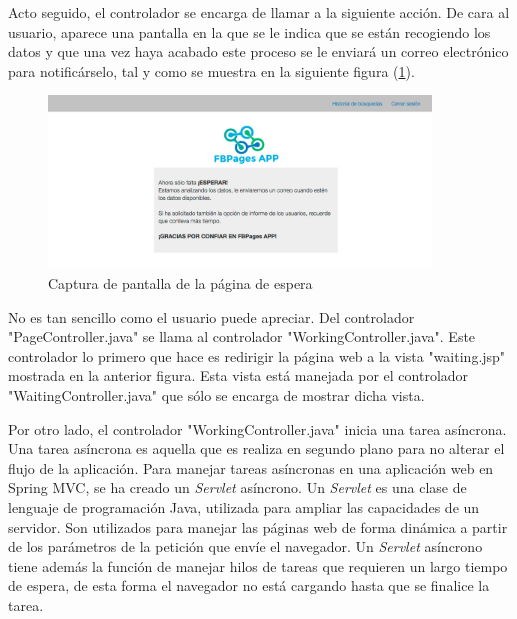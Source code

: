 Acto seguido, el controlador se encarga de llamar a la siguiente acción. De cara al usuario, aparece una pantalla en la que se le indica que se están recogiendo los datos y que una vez haya acabado este proceso se le enviará un correo electrónico para notificárselo, tal y como se muestra en la siguiente figura (\ref{fig:working}).
\begin{figure}[H]
\centering
\includegraphics[width=4in]{figuras/working.png}
\caption{Captura de pantalla de la página de espera} \label{fig:working}
\end{figure}
No es tan sencillo como el usuario puede apreciar. Del controlador "PageController.java" se llama al controlador "WorkingController.java". Este controlador lo primero que hace es redirigir la página web a la vista "waiting.jsp" mostrada en la anterior figura. Esta vista está manejada por el controlador "WaitingController.java" que sólo se encarga de mostrar dicha vista. 

Por otro lado, el controlador  "WorkingController.java" inicia una tarea asíncrona. Una tarea asíncrona es aquella que es realiza en segundo plano para no alterar el flujo de la aplicación. 
Para manejar tareas asíncronas en una aplicación web en Spring MVC, se ha creado un \textit{Servlet} asíncrono. 
Un \textit{Servlet} es una clase de lenguaje de programación Java, utilizada para ampliar las capacidades de un servidor. Son utilizados para manejar las páginas web de forma dinámica a partir de los parámetros de la petición que envíe el navegador. Un \textit{Servlet} asíncrono tiene además la función de manejar hilos de tareas que requieren un largo tiempo de espera, de esta forma el navegador no está cargando hasta que se finalice la tarea. 

